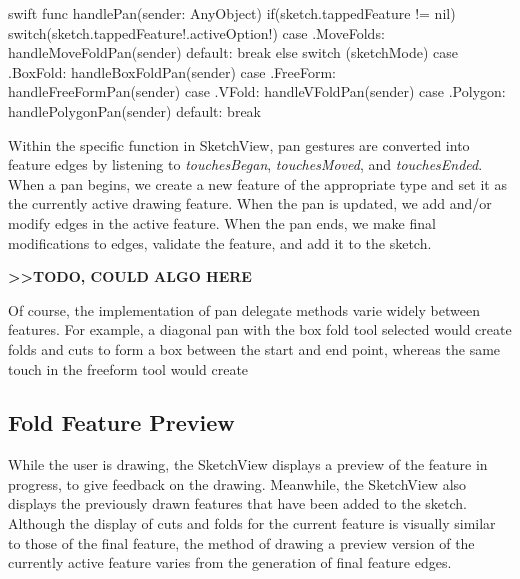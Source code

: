 \small
\singlespacing 

\begin{pygmented}{swift}
    func handlePan(sender: AnyObject) {
        if(sketch.tappedFeature != nil){
            switch(sketch.tappedFeature!.activeOption!){
            case .MoveFolds:
                handleMoveFoldPan(sender)
            default: break
            }
        }
        else{
            switch (sketchMode) {
            case .BoxFold:
                handleBoxFoldPan(sender)
            case .FreeForm:
                handleFreeFormPan(sender)
            case .VFold:
                handleVFoldPan(sender)
            case .Polygon:
                handlePolygonPan(sender)
            default:
                break
            }
        }
    }
\end{pygmented}

\doublespacing
\normalsize

Within the specific function in SketchView, pan gestures are converted
into feature edges by listening to \emph{touchesBegan},
\emph{touchesMoved}, and \emph{touchesEnded}. When a pan begins, we
create a new feature of the appropriate type and set it as the currently
active drawing feature. When the pan is updated, we add and/or modify
edges in the active feature. When the pan ends, we make final
modifications to edges, validate the feature, and add it to the sketch.

\textbf{\textgreater{}\textgreater{}TODO, COULD ALGO HERE}

Of course, the implementation of pan delegate methods varie widely
between features. For example, a diagonal pan with the box fold tool
selected would create folds and cuts to form a box between the start and
end point, whereas the same touch in the freeform tool would create

\subsection{Fold Feature Preview}\label{fold-feature-preview}

While the user is drawing, the SketchView displays a preview of the
feature in progress, to give feedback on the drawing. Meanwhile, the
SketchView also displays the previously drawn features that have been
added to the sketch. Although the display of cuts and folds for the
current feature is visually similar to those of the final feature, the
method of drawing a preview version of the currently active feature
varies from the generation of final feature edges.

